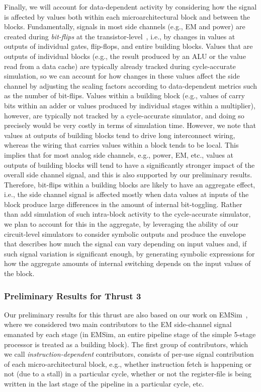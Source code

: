 Finally, we will account for data-dependent activity by considering how the signal is affected by values both within each microarchitectural block and between the blocks. Fundamentally, signals in most side channels (e.g., EM and power) are created during  \textit{bit-flips} at the transistor-level~\cite{VANECK1985269,6766222}, i.e., by changes in values at outputs of individual gates, flip-flops, and entire building blocks. Values that are outputs of individual blocks (e.g., the result produced by an ALU or the value read from a data cache) are typically already tracked during cycle-accurate simulation, so we can account for how changes in these values affect the side channel by adjusting the scaling factors according to data-dependent metrics such as the number of bit-flips. Values within a building block (e.g., values of carry bits within an adder or values produced by individual stages within a multiplier), however, are typically not tracked by a cycle-accurate simulator, and doing so precisely would be very costly in terms of simulation time. However, we note that values at outputs of building blocks tend to drive long interconnect wiring, whereas the wiring that carries values within a block tends to be local. This implies that for most analog side channels, e.g., power, EM, etc., values at outputs of building blocks will tend to have a significantly stronger impact of the overall side channel signal, and this is also supported by our preliminary results. Therefore, bit-flips within a building blocks are likely to have an aggregate effect, i.e., the side channel signal is affected mostly when data values at inputs of the block produce large differences in the amount of internal bit-toggling. Rather than add simulation of such intra-block activity to the cycle-accurate simulator, we plan to account for this in the aggregate, by leveraging the ability of our circuit-level simulators to consider symbolic outputs and produce the envelope that describes how much the signal can vary depending on input values and, if such signal variation is significant enough, by generating symbolic expressions for how the aggregate amounts of internal switching depends on the input values of the block.

\subsubsection{Preliminary Results for Thrust 3}
\label{sec:prelim-transform}

Our preliminary results for this thrust are also based on our work on EMSim~\cite{Nader2020}, where we considered two main contributors to the EM side-channel signal emanated by each stage (in EMSim, an entire pipeline stage of the simple 5-stage processor is treated as a building block). The first group of contributors, which we call \textit{instruction-dependent} contributors, consists of per-use signal contribution of each micro-architectural block, e.g., whether instruction fetch is happening or not (due to a stall) in a particular cycle, whether or not the register-file is being written in the last stage of the pipeline in a particular cycle, etc.

